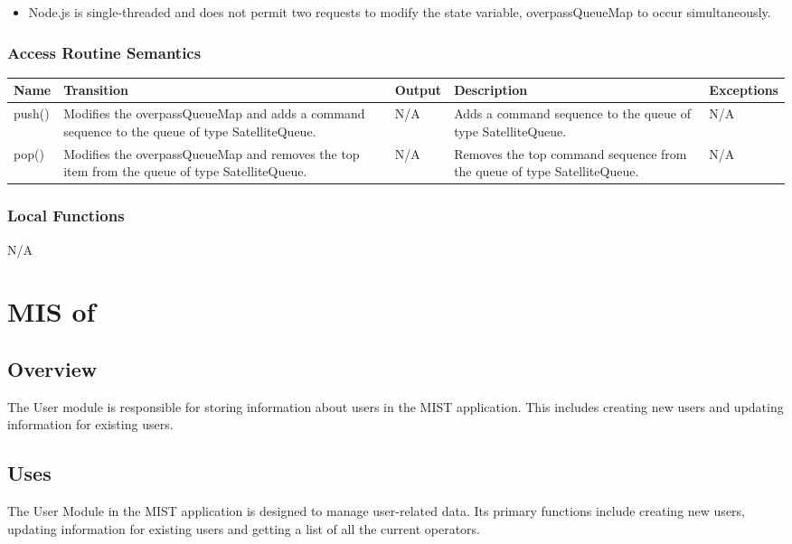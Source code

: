 \documentclass[12pt, titlepage]{article}
\begin{document}
\begin{itemize}
    \item Node.js is single-threaded and does not permit two requests to modify the state variable, overpassQueueMap to occur simultaneously.
\end{itemize}

\subsubsection{Access Routine Semantics}

\begin{center}
\begin{tabular}{|p{3.2cm} |p{3cm} | p{1.3cm} |p{5cm} |p{4cm}|}
\hline
\textbf{Name} & \textbf{Transition} & \textbf{Output} & \textbf{Description} & \textbf{Exceptions} \\
\hline
push() & Modifies the overpassQueueMap and adds a command sequence to the queue of type SatelliteQueue. & N/A & Adds a command sequence to the queue of type SatelliteQueue. & N/A \\
\hline
pop() & Modifies the overpassQueueMap and removes the top item from the queue of type SatelliteQueue. & N/A & Removes the top command sequence from the queue of type SatelliteQueue. & N/A \\
\hline
\end{tabular}
\end{center}

\subsubsection{Local Functions}
N/A



\section{MIS of } \label{Module} 


\subsection{Overview}
The User module is responsible for storing information about users in the MIST application. This includes creating new users and updating information for existing users.

\subsection{Uses}
The User Module in the MIST application is designed to manage user-related data. Its primary functions include creating new users, updating information for existing users and getting a list of all the current operators.
\end{document}
